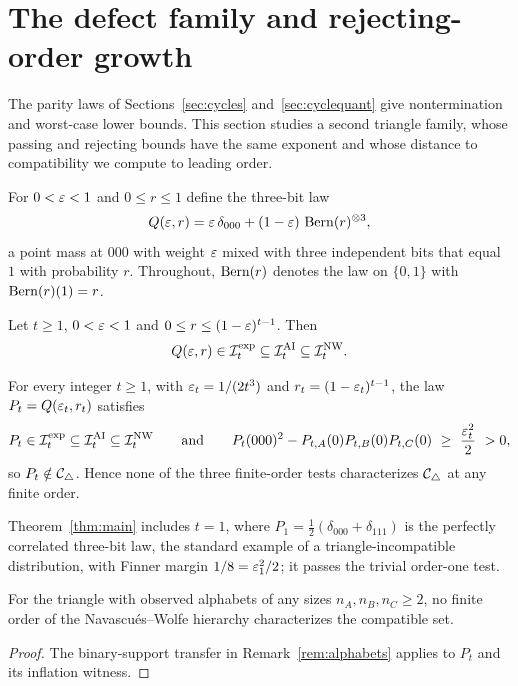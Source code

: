 \section{The defect family and rejecting-order growth}\label{sec:main}

The parity laws of Sections~\ref{sec:cycles} and~\ref{sec:cyclequant} give nontermination and worst-case lower bounds. This section studies a second triangle family, whose passing and rejecting bounds have the same exponent and whose distance to compatibility we compute to leading order.

For $0<\varepsilon<1$ and $0\le r\le1$ define the three-bit law
\begin{equation}\label{eq:Q}
Q(\varepsilon,r)=\varepsilon\,\delta_{000}+(1-\varepsilon)\,\operatorname{Bern}(r)^{\otimes3},
\end{equation}
a point mass at $000$ with weight $\varepsilon$ mixed with three independent bits that equal $1$ with probability $r$. Throughout, $\operatorname{Bern}(r)$ denotes the law on $\{0,1\}$ with $\operatorname{Bern}(r)(1)=r$.

\begin{theorem}\label{thm:membership}
Let $t\ge1$, $0<\varepsilon<1$ and $0\le r\le(1-\varepsilon)^{t-1}$. Then
\[
Q(\varepsilon,r)\in\mathcal I^{\mathrm{exp}}_t\subseteq\mathcal I^{\mathrm{AI}}_t\subseteq\mathcal I^{\mathrm{NW}}_t.
\]
\end{theorem}

\begin{theorem}\label{thm:main}\label{thm:main-intro}
For every integer $t\ge1$, with $\varepsilon_t=1/(2t^3)$ and $r_t=(1-\varepsilon_t)^{t-1}$, the law $P_t=Q(\varepsilon_t,r_t)$ satisfies
\[
P_t\in\Iexp_t\subseteq\IAI_t\subseteq\INW_t
\qquad\text{and}\qquad
P_t(000)^2-P_{t,A}(0)P_{t,B}(0)P_{t,C}(0)\ \ge\ \frac{\eps_t^2}{2}\ >0,
\]
so $P_t\notin\mathcal C_{\triangle}$. Hence none of the three finite-order tests characterizes $\mathcal C_{\triangle}$ at any finite order.
\end{theorem}

Theorem~\ref{thm:main} includes $t=1$, where $P_1=\tfrac12(\delta_{000}+\delta_{111})$ is the perfectly correlated three-bit law, the standard example of a triangle-incompatible distribution, with Finner margin $1/8=\varepsilon_1^2/2$; it passes the trivial order-one test.

\begin{corollary}\label{cor:alphabets}
For the triangle with observed alphabets of any sizes $n_A,n_B,n_C\ge2$, no finite order of the Navascués--Wolfe hierarchy characterizes the compatible set.
\end{corollary}
\begin{proof}
The binary-support transfer in Remark~\ref{rem:alphabets} applies to $P_t$ and its inflation witness.
\end{proof}









